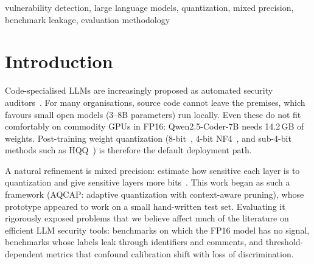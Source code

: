 \documentclass[conference]{IEEEtran}
\begin{document}
\begin{IEEEkeywords}
vulnerability detection, large language models, quantization, mixed precision, benchmark leakage, evaluation methodology
\end{IEEEkeywords}

\section{Introduction}
Code-specialised LLMs are increasingly proposed as automated security auditors~\cite{ullah2024secllmholmes,ding2024primevul}. For many organisations, source code cannot leave the premises, which favours small open models (3--8B parameters) run locally. Even these do not fit comfortably on commodity GPUs in FP16: Qwen2.5-Coder-7B needs 14.2\,GB of weights. Post-training weight quantization (8-bit~\cite{dettmers2022llmint8}, 4-bit NF4~\cite{dettmers2023qlora}, and sub-4-bit methods such as HQQ~\cite{badri2023hqq}) is therefore the default deployment path.

A natural refinement is mixed precision: estimate how sensitive each layer is to quantization and give sensitive layers more bits~\cite{dong2019hawq}. This work began as such a framework (AQCAP: adaptive quantization with context-aware pruning), whose prototype appeared to work on a small hand-written test set. Evaluating it rigorously exposed problems that we believe affect much of the literature on efficient LLM security tools: benchmarks on which the FP16 model has no signal, benchmarks whose labels leak through identifiers and comments, and threshold-dependent metrics that confound calibration shift with loss of discrimination.
\end{document}

